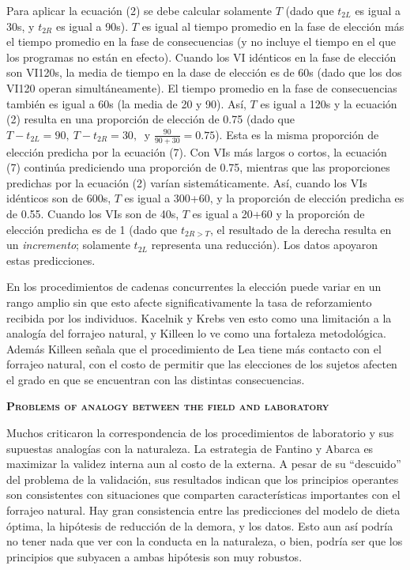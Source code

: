 \documentclass[a4paper,12pt]{article}
\begin{document}
Para aplicar la ecuación (2) se debe calcular solamente $T$ (dado que $t_{2L}$ es igual a 30s, y $t_{2R}$ es igual a 90s). $T$ es igual al tiempo promedio en la fase de elección más el tiempo promedio en la fase de consecuencias (y no incluye el tiempo en el que los programas no están en efecto). Cuando los VI idénticos en la fase de elección son VI120s, la media de tiempo en la dase de elección es de 60s (dado que los dos VI120 operan simultáneamente). El tiempo promedio en la fase de consecuencias también es igual a 60s (la media de 20 y 90). Así, $T$ es igual a 120s y la ecuación (2) resulta en una proporción de elección de 0.75 (dado que $T-t_{2L} = 90,\ T-t_{2R} = 30,\ \mbox{ y } \frac{90}{90+30} = 0{.}75$). Esta es la misma proporción de elección predicha por la ecuación (7). Con VIs más largos o cortos, la ecuación (7) continúa prediciendo una proporción de 0.75, mientras que las proporciones predichas por la ecuación (2) varían sistemáticamente. Así, cuando los VIs idénticos son de 600s, $T$ es igual a 300+60, y la proporción de elección predicha es de 0.55. Cuando los VIs son de 40s, $T$ es igual a 20+60 y la proporción de elección predicha es de 1 (dado que $t_{2R > T}$, el resultado de la derecha resulta en un {\itshape incremento}; solamente $t_{2L}$ representa una reducción). Los datos apoyaron estas predicciones.

En los procedimientos de cadenas concurrentes la elección puede variar en un rango amplio sin que esto afecte significativamente la tasa de reforzamiento recibida por los individuos. Kacelnik y Krebs ven esto como una limitación a la analogía del forrajeo natural, y Killeen lo ve como una fortaleza metodológica. Además Killeen señala que el procedimiento de Lea tiene más contacto con el forrajeo natural, con el costo de permitir que las elecciones de los sujetos afecten el grado en que se encuentran con las distintas consecuencias.

{\scshape\bfseries Problems of analogy between the field and laboratory}

Muchos criticaron la correspondencia de los procedimientos de laboratorio y sus supuestas analogías con la naturaleza. La estrategia de Fantino y Abarca es maximizar la validez interna aun al costo de la externa. A pesar de su ``descuido'' del problema de la validación, sus resultados indican que los principios operantes son consistentes con situaciones que comparten características importantes con el forrajeo natural. Hay gran consistencia entre las predicciones del modelo de dieta óptima, la hipótesis de reducción de la demora, y los datos. Esto aun así podría no tener nada que ver con la conducta en la naturaleza, o bien, podría ser que los principios que subyacen a ambas hipótesis son muy robustos. 
\end{document}
